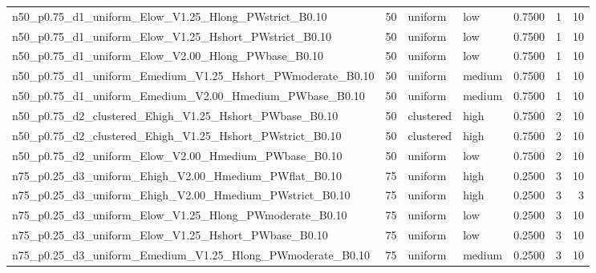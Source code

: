 \begin{tabular}{lrllrrr}
n50_p0.75_d1_uniform_Elow_V1.25_Hlong_PWstrict_B0.10 & 50 & uniform & low & 0.7500 & 1 & 10 \\
n50_p0.75_d1_uniform_Elow_V1.25_Hshort_PWstrict_B0.10 & 50 & uniform & low & 0.7500 & 1 & 10 \\
n50_p0.75_d1_uniform_Elow_V2.00_Hlong_PWbase_B0.10 & 50 & uniform & low & 0.7500 & 1 & 10 \\
n50_p0.75_d1_uniform_Emedium_V1.25_Hshort_PWmoderate_B0.10 & 50 & uniform & medium & 0.7500 & 1 & 10 \\
n50_p0.75_d1_uniform_Emedium_V2.00_Hmedium_PWbase_B0.10 & 50 & uniform & medium & 0.7500 & 1 & 10 \\
n50_p0.75_d2_clustered_Ehigh_V1.25_Hshort_PWbase_B0.10 & 50 & clustered & high & 0.7500 & 2 & 10 \\
n50_p0.75_d2_clustered_Ehigh_V1.25_Hshort_PWstrict_B0.10 & 50 & clustered & high & 0.7500 & 2 & 10 \\
n50_p0.75_d2_uniform_Elow_V2.00_Hmedium_PWbase_B0.10 & 50 & uniform & low & 0.7500 & 2 & 10 \\
n75_p0.25_d3_uniform_Ehigh_V2.00_Hmedium_PWflat_B0.10 & 75 & uniform & high & 0.2500 & 3 & 10 \\
n75_p0.25_d3_uniform_Ehigh_V2.00_Hmedium_PWstrict_B0.10 & 75 & uniform & high & 0.2500 & 3 & 3 \\
n75_p0.25_d3_uniform_Elow_V1.25_Hlong_PWmoderate_B0.10 & 75 & uniform & low & 0.2500 & 3 & 10 \\
n75_p0.25_d3_uniform_Elow_V1.25_Hshort_PWbase_B0.10 & 75 & uniform & low & 0.2500 & 3 & 10 \\
n75_p0.25_d3_uniform_Emedium_V1.25_Hlong_PWmoderate_B0.10 & 75 & uniform & medium & 0.2500 & 3 & 10 \\
\bottomrule
\end{tabular}
